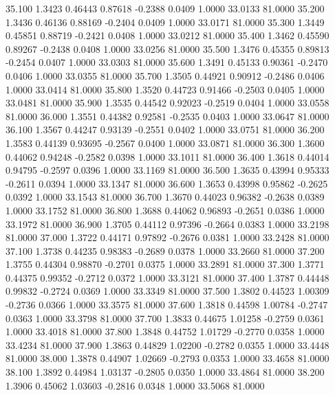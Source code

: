   35.100   1.3423   0.46443   0.87618  -0.2388   0.0409   1.0000  33.0133  81.0000
  35.200   1.3436   0.46136   0.88169  -0.2404   0.0409   1.0000  33.0171  81.0000
  35.300   1.3449   0.45851   0.88719  -0.2421   0.0408   1.0000  33.0212  81.0000
  35.400   1.3462   0.45590   0.89267  -0.2438   0.0408   1.0000  33.0256  81.0000
  35.500   1.3476   0.45355   0.89813  -0.2454   0.0407   1.0000  33.0303  81.0000
  35.600   1.3491   0.45133   0.90361  -0.2470   0.0406   1.0000  33.0355  81.0000
  35.700   1.3505   0.44921   0.90912  -0.2486   0.0406   1.0000  33.0414  81.0000
  35.800   1.3520   0.44723   0.91466  -0.2503   0.0405   1.0000  33.0481  81.0000
  35.900   1.3535   0.44542   0.92023  -0.2519   0.0404   1.0000  33.0558  81.0000
  36.000   1.3551   0.44382   0.92581  -0.2535   0.0403   1.0000  33.0647  81.0000
  36.100   1.3567   0.44247   0.93139  -0.2551   0.0402   1.0000  33.0751  81.0000
  36.200   1.3583   0.44139   0.93695  -0.2567   0.0400   1.0000  33.0871  81.0000
  36.300   1.3600   0.44062   0.94248  -0.2582   0.0398   1.0000  33.1011  81.0000
  36.400   1.3618   0.44014   0.94795  -0.2597   0.0396   1.0000  33.1169  81.0000
  36.500   1.3635   0.43994   0.95333  -0.2611   0.0394   1.0000  33.1347  81.0000
  36.600   1.3653   0.43998   0.95862  -0.2625   0.0392   1.0000  33.1543  81.0000
  36.700   1.3670   0.44023   0.96382  -0.2638   0.0389   1.0000  33.1752  81.0000
  36.800   1.3688   0.44062   0.96893  -0.2651   0.0386   1.0000  33.1972  81.0000
  36.900   1.3705   0.44112   0.97396  -0.2664   0.0383   1.0000  33.2198  81.0000
  37.000   1.3722   0.44171   0.97892  -0.2676   0.0381   1.0000  33.2428  81.0000
  37.100   1.3738   0.44235   0.98383  -0.2689   0.0378   1.0000  33.2660  81.0000
  37.200   1.3755   0.44304   0.98870  -0.2701   0.0375   1.0000  33.2891  81.0000
  37.300   1.3771   0.44375   0.99352  -0.2712   0.0372   1.0000  33.3121  81.0000
  37.400   1.3787   0.44448   0.99832  -0.2724   0.0369   1.0000  33.3349  81.0000
  37.500   1.3802   0.44523   1.00309  -0.2736   0.0366   1.0000  33.3575  81.0000
  37.600   1.3818   0.44598   1.00784  -0.2747   0.0363   1.0000  33.3798  81.0000
  37.700   1.3833   0.44675   1.01258  -0.2759   0.0361   1.0000  33.4018  81.0000
  37.800   1.3848   0.44752   1.01729  -0.2770   0.0358   1.0000  33.4234  81.0000
  37.900   1.3863   0.44829   1.02200  -0.2782   0.0355   1.0000  33.4448  81.0000
  38.000   1.3878   0.44907   1.02669  -0.2793   0.0353   1.0000  33.4658  81.0000
  38.100   1.3892   0.44984   1.03137  -0.2805   0.0350   1.0000  33.4864  81.0000
  38.200   1.3906   0.45062   1.03603  -0.2816   0.0348   1.0000  33.5068  81.0000
